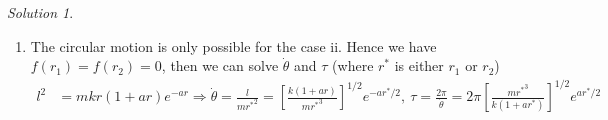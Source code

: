 \documentclass[twoside,11pt]{article}
\newcommand{\lms}{\fontfamily{lmss}\selectfont} %
\theoremstyle{definition}
\theoremstyle{remark}
\newtheorem*{solution}{\lms Solution}
\begin{document}
\begin{solution}
\begin{enumerate}[label=\alph*)]
\begin{enumerate}[label=\roman*.]
\item $V_\text{eff}$ looks like the following figure
\begin{figure}[H]
    \centering
\end{figure}
\end{enumerate}
Hence, $V_\text{eff}$ will have a local minimum at $r_0$ 
and a local maximum at $r_1$.
The solution will be bounded if $E < V_\text{eff}(r_1)$.

\item The circular motion is only possible for the case ii.
Hence we have $f(r_1) = f(r_2) = 0$, then we can solve $\dot\theta$ and $\tau$
(where $r^*$ is either $r_1$ or $r_2$)
\begin{align*}
    l^2 &= mkr(1+ar)e^{-ar}
    \Rightarrow\dot\theta = \frac{l}{m{r^*}^2} = 
    \left[\frac{k(1+ar)}{m{r^*}^3}\right]^{1/2}e^{-a{r^*}/2}
    ,~
    \tau = \frac{2\pi}{\dot\theta} = 
    2\pi\left[\frac{m{r^*}^3}{k(1+a{r^*})}\right]^{1/2}e^{a{r^*}/2}
\end{align*}
\end{enumerate}
\end{solution}




\end{document}
